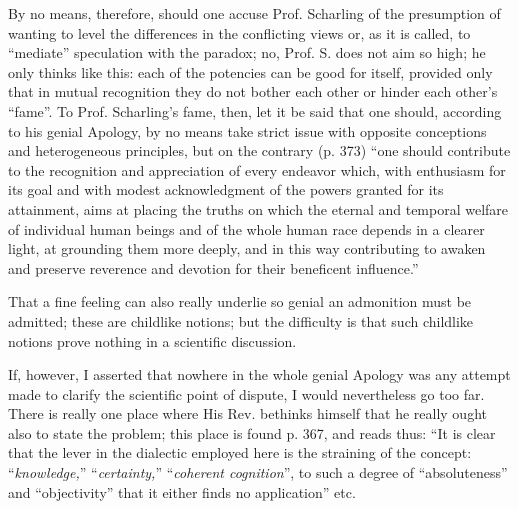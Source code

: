 \documentclass[12pt,a4paper,openany]{book}
\newcommand{\opage}[1]{\marginnote{\footnotesize\textit{[#1]}}}
\begin{document}
By no means, therefore, should one accuse Prof. Scharling
of the presumption of wanting to level the differences in the conflicting
views or, as it is called, to ``mediate'' speculation
with the paradox; no, Prof. S. does not aim so
high; he only thinks like this: each of the potencies can
be good for itself, provided only that in mutual recognition
they do not bother each other or hinder each other's ``fame''.
To Prof. Scharling's fame, then, let it be said that
one should, according to his genial Apology, by no means
take strict issue with opposite conceptions and heterogeneous
principles, but on the contrary (p. 373) ``one should contribute
to the recognition and appreciation of every endeavor
which, with enthusiasm for its goal and with modest acknowledgment
of the powers granted for its attainment,
aims at placing the truths on which
the eternal and temporal welfare of individual human beings and of the whole human race
depends in a clearer light, at grounding them
more deeply, and in this way contributing to awaken and
preserve reverence and devotion for their beneficent
influence.''

That a fine feeling can also really underlie
so genial an admonition must be admitted;
these are childlike notions; but the difficulty is that
such childlike notions prove nothing in a scientific
discussion.

If, however, I asserted that nowhere in the whole genial
Apology was any attempt made to
clarify the scientific point of dispute, I would nevertheless go
too far. There is really one place where His Rev. bethinks himself
that he really ought also to state the
\setcounter{footnote}{0}%
\opage{22}problem; this place is found p. 367, and reads thus:
``It is clear that the lever in the dialectic employed
here is the straining of the concept: ``\emph{knowledge,}'' ``\emph{certainty,}''
``\emph{coherent cognition}'', to such a
degree of ``absoluteness'' and ``objectivity'' that it either
finds no application'' etc.
\end{document}
